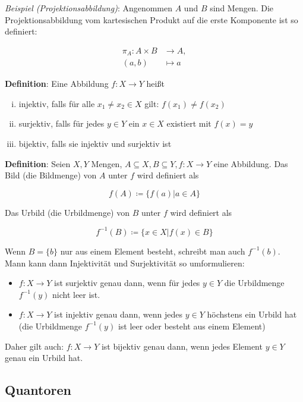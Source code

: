 \documentclass{article}
\begin{document}
\emph{Beispiel (Projektionsabbildung)}: Angenommen $A$ und $B$ sind Mengen. Die Projektionsabbildung vom
kartesischen Produkt auf die erste Komponente ist so definiert:

\begin{align*}
\pi_{A}: A \times B &\to A, \\
(a,b) &\mapsto a\
\end{align*}

\textbf{Definition}: Eine Abbildung $f:X \to Y$ heißt

\begin{enumerate}[(i)]
\item injektiv, falls für alle $x_1 \ne x_2 \in X$ gilt: $f(x_1) \ne f(x_2)$
\item surjektiv, falls für jedes $y \in Y$ ein $x \in X$ existiert mit $f(x) = y$
\item bijektiv, falls sie injektiv und surjektiv ist
\end{enumerate}

\textbf{Definition}: Seien $X, Y$ Mengen, $A \subseteq X, B \subseteq Y, f \colon X \to Y$ eine Abbildung.
Das Bild (die Bildmenge) von $A$ unter $f$ wird definiert als

\[
  f(A) \coloneqq \{ f(a) | a \in A\}
\]

Das Urbild (die Urbildmenge) von $B$ unter $f$ wird definiert als

\[
  f^{-1}(B) \coloneqq \{ x \in X | f(x) \in B \}
\]

Wenn $B = \{ b \}$ nur aus einem Element besteht, schreibt man auch $f^{-1}(b)$. \\

Mann kann dann Injektivität und Surjektivität so umformulieren: \\
\begin{itemize}
\item $f \colon X \to Y$ ist surjektiv genau dann, wenn für jedes $y \in Y$ die Urbildmenge $f^{-1}(y)$ nicht leer ist. \\ 
\item $f \colon X \to Y$ ist injektiv genau dann, wenn jedes $y \in Y$ höchstens ein Urbild hat (die Urbildmenge $f^{-1}(y)$ ist leer
  oder besteht aus einem Element) \\
\end{itemize}

Daher gilt auch: $f \colon X \to Y$ ist bijektiv genau dann, wenn jedes Element $y \in Y$ genau ein Urbild hat.

\subsection*{Quantoren}
\end{document}
